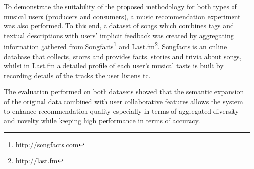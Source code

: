 To demonstrate the suitability of the proposed methodology for both types of musical users (producers and consumers), a music recommendation experiment was also performed. To this end, a dataset of songs which combines tags and textual descriptions with users' implicit feedback was created by aggregating information gathered from Songfacts\footnote{\url{http://songfacts.com}} and Last.fm\footnote{\url{http://last.fm}}. Songfacts is an online database that collects, stores and provides facts, stories and trivia about songs, whilst in Last.fm a detailed profile of each user's musical taste is built by recording details of the tracks the user listens to.

The evaluation performed on both datasets showed that the semantic expansion of the original data combined with user collaborative features allows the system to enhance recommendation quality especially in terms of aggregated diversity and novelty while keeping high performance in terms of accuracy. %


